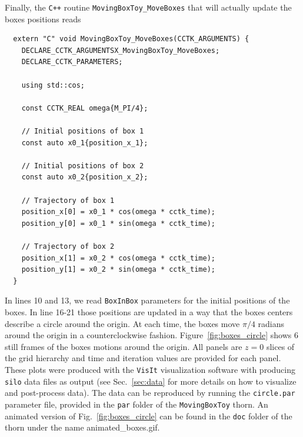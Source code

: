 Finally, the \texttt{C++} routine \texttt{MovingBoxToy\_MoveBoxes} that will actually update the boxes positions reads
%
\begin{verbatim}
  extern "C" void MovingBoxToy_MoveBoxes(CCTK_ARGUMENTS) {
    DECLARE_CCTK_ARGUMENTSX_MovingBoxToy_MoveBoxes;
    DECLARE_CCTK_PARAMETERS;

    using std::cos;

    const CCTK_REAL omega{M_PI/4};

    // Initial positions of box 1
    const auto x0_1{position_x_1};

    // Initial positions of box 2
    const auto x0_2{position_x_2};

    // Trajectory of box 1
    position_x[0] = x0_1 * cos(omega * cctk_time);
    position_y[0] = x0_1 * sin(omega * cctk_time);

    // Trajectory of box 2
    position_x[1] = x0_2 * cos(omega * cctk_time);
    position_y[1] = x0_2 * sin(omega * cctk_time);
  }
\end{verbatim}

In lines 10 and 13, we read \texttt{BoxInBox} parameters for the initial positions of the boxes. In line 16-21 those positions are updated in a way that the boxes centers describe a circle around the origin. At each time, the boxes move $\pi/4$ radians around the origin in a counterclockwise fashion. Figure~\ref{fig:boxes_circle} shows 6 still frames of the boxes motions around the origin. All panels are $z=0$ slices of the grid hierarchy and time and iteration values are provided for each panel. These plots were produced with the \texttt{VisIt} visualization software with \CarpetX\space producing \texttt{silo} data files as output (see Sec.~\ref{sec:data} for more details on how to visualize and post-process \CarpetX\space data). The data can be reproduced by running the \texttt{circle.par} parameter file, provided in the \texttt{par} folder of the \texttt{MovingBoxToy} thorn. An animated version of Fig.~\ref{fig:boxes_circle} can be found in the \texttt{doc} folder of the \CarpetX\space thorn under the name {animated\_boxes.gif}.

